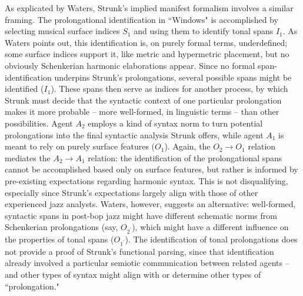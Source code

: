 As explicated by Waters, Strunk's implied manifest formalism involves a similar framing.  The prolongational identification in ``Windows" is accomplished by selecting musical surface indices $S_1$ and using them to identify tonal spans $I_1$.  As Waters points out, this identification is, on purely formal terms, underdefined; some surface indices support it, like metric and hypermetric placement, but no obviously Schenkerian harmonic elaborations appear. Since no formal span-identification underpins Strunk's prolongations, several possible spans might be identified ($I_1$).  These spans then serve as indices for another process, by which Strunk must decide that the syntactic context of one particular prolongation makes it more probable -- more well-formed, in linguistic terms -- than other possibilities.  Agent $A_2$ employs a kind of syntax norm to turn potential prolongations into the final syntactic analysis Strunk offers, while agent $A_1$ is meant to rely on purely surface features ($O_1$).  Again, the $O_2 \rightarrow O_1$ relation mediates the $A_2 \rightarrow A_1$ relation: the identification of the prolongational spans cannot be accomplished based only on surface features, but rather is informed by pre-existing expectations regarding harmonic syntax.  This is not disqualifying, especially since Strunk's expectations largely align with those of other experienced jazz analysts.  Waters, however, suggests an alternative: well-formed, syntactic spans in post-bop jazz might have different schematic norms from Schenkerian prolongations (say, $O_{2^{\prime}}$), which might have a different influence on the properties of tonal spans ($O_{1^{\prime}}$).  The identification of tonal prolongations does not provide a proof of Strunk's functional parsing, since that identification already involved a particular semiotic communication between related agents -- and other types of syntax might align with or determine other types of ``prolongation."

